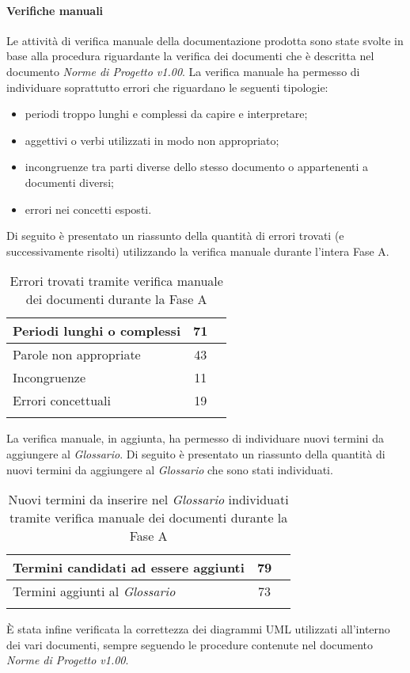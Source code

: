 \documentclass[../PianoDiQualifica.tex]{subfiles}
\begin{document}
\begin{appendices}
			\paragraph{Verifiche manuali}
			Le attività di verifica manuale della documentazione prodotta sono state svolte in base alla procedura riguardante la verifica dei documenti che è descritta nel documento \textit{Norme di Progetto v1.00}. La verifica manuale ha permesso di individuare soprattutto errori che riguardano le seguenti tipologie:
			\begin{itemize}
				\item periodi troppo lunghi e complessi da capire e interpretare;
				\item aggettivi o verbi utilizzati in modo non appropriato;
				\item incongruenze tra parti diverse dello stesso documento o appartenenti a documenti diversi;
				\item errori nei concetti esposti.
			\end{itemize}
			Di seguito è presentato un riassunto della quantità di errori trovati (e successivamente risolti) utilizzando la verifica manuale durante l'intera Fase A.
\begin{longtable}{|l|c|c|}
 \hline Periodi lunghi o complessi      &  71\\
 \hline Parole non appropriate     &  43\\
 \hline Incongruenze       &  11\\
 \hline Errori concettuali      &  19\\
\hline
\caption{Errori trovati tramite verifica manuale dei documenti durante la Fase A}
\end{longtable}
			La verifica manuale, in aggiunta, ha permesso di individuare nuovi termini da aggiungere al \textit{Glossario}. Di seguito è presentato un riassunto della quantità di nuovi termini da aggiungere al \textit{Glossario} che sono stati individuati.
\begin{longtable}{|l|c|c|}
 \hline Termini candidati ad essere aggiunti      &  79\\
 \hline Termini aggiunti al \textit{Glossario}     &  73\\
\hline
\caption{Nuovi termini da inserire nel \textit{Glossario} individuati tramite verifica manuale dei documenti durante la Fase A}
\end{longtable}	
			È stata infine verificata la correttezza dei diagrammi UML utilizzati all'interno dei vari documenti, sempre seguendo le procedure contenute nel documento \textit{Norme di Progetto v1.00}.

\end{appendices}
\end{document}
